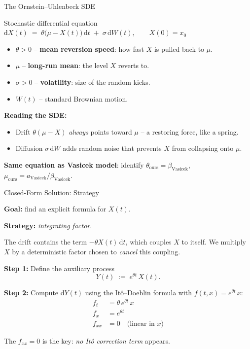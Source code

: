 \documentclass[10pt,aspectratio=169]{beamer}
\newcommand{\dd}{\mathrm{d}}
\begin{document}
\begin{frame}{The Ornstein--Uhlenbeck SDE}

\begin{block}{Stochastic differential equation}
\centering
$\dd X(t) \;=\; \theta\bigl(\mu - X(t)\bigr)\,\dd t \;+\; \sigma\,\dd W(t),
\qquad X(0)=x_0$
\end{block}

\medskip
\begin{itemize}
  \item $\theta > 0$ -- \textbf{mean reversion speed}: how fast $X$ is pulled back to $\mu$.
  \item $\mu$ -- \textbf{long-run mean}: the level $X$ reverts to.
  \item $\sigma > 0$ -- \textbf{volatility}: size of the random kicks.
  \item $W(t)$ -- standard Brownian motion.
\end{itemize}

\bigskip
\textbf{Reading the SDE:}

\begin{itemize}
  \item Drift $\theta(\mu - X)$ \emph{always} points toward $\mu$
        -- a restoring force, like a spring.
  \item Diffusion $\sigma\,\dd W$ adds random noise that prevents $X$
        from collapsing onto $\mu$.
\end{itemize}

\medskip
\textbf{Same equation as Vasicek model}:
identify $\theta_{\text{ours}} = \beta_{\text{Vasicek}}$,
$\mu_{\text{ours}} = a_{\text{Vasicek}}/\beta_{\text{Vasicek}}$.

\end{frame}

\begin{frame}{Closed-Form Solution: Strategy}

\textbf{Goal:} find an explicit formula for $X(t)$.

\bigskip
\textbf{Strategy:} \emph{integrating factor}.

The drift contains the term $-\theta X(t)\,\dd t$, which couples $X$ to
itself. We multiply $X$ by a deterministic factor chosen to \emph{cancel}
this coupling.

\bigskip
\textbf{Step 1:} Define the auxiliary process
\[
Y(t) \;:=\; e^{\theta t}\,X(t).
\]

\bigskip
\textbf{Step 2:} Compute $\dd Y(t)$ using the It\^o--Doeblin formula with $f(t,x) = e^{\theta t}\,x$:
\begin{align*}
  f_t       &= \theta\,e^{\theta t}\,x \\
  f_x       &= e^{\theta t} \\
  f_{xx}    &= 0 \quad \text{(linear in } x\text{)}
\end{align*}

The $f_{xx} = 0$ is the key: \emph{no It\^o correction term} appears.

\end{frame}
\end{document}

